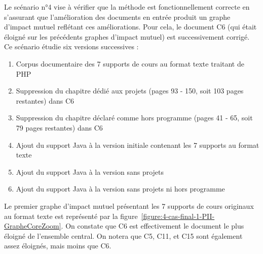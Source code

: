 \clearpage %
\newpage   %




Le scénario n°4 vise à vérifier que la méthode est fonctionnellement correcte en s'assurant que l'amélioration des documents en entrée produit un graphe d'impact mutuel reflétant ces améliorations.
Pour cela, le document C6 (qui était éloigné sur les précédents graphes d'impact mutuel) est successivement corrigé.
Ce scénario étudie six versions successives :
\begin{enumerate}
\item Corpus documentaire des 7 supports de cours au format texte traitant de PHP
\item Suppression du chapitre dédié aux projets (pages 93 - 150, soit 103 pages restantes) dans C6
\item Suppression du chapitre déclaré comme \og hors programme \fg (pages 41 - 65, soit 79 pages restantes) dans C6
\item Ajout du support Java à la version initiale contenant les 7 supports au format texte
\item Ajout du support Java à la version sans projets
\item Ajout du support Java à la version sans projets ni \og hors programme \fg
\end{enumerate}

\bigskip

Le premier graphe d'impact mutuel présentant les 7 supports de cours originaux au format texte est représenté par la figure~\ref{figure:4-cas-final-1-PII-GrapheCoreZoom}.
On constate que C6 est effectivement le document le plus éloigné de l'ensemble central.
On notera que C5, C11, et C15 sont également assez éloignés, mais moins que C6.

\vfill
\hspace{0pt}

